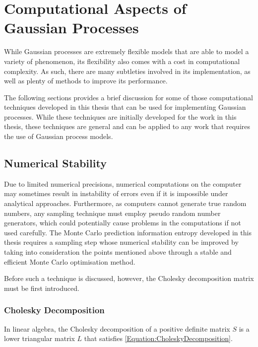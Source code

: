 \chapter{Computational Aspects of Gaussian Processes}
\label{Appendix:ComputationalAspects}

	While Gaussian processes are extremely flexible models that are able to model a variety of phenomenon, its flexibility also comes with a cost in computational complexity. As such, there are many subtleties involved in its implementation, as well as plenty of methods to improve its performance.
	
	The following sections provides a brief discussion for some of those computational techniques developed in this thesis that can be used for implementing Gaussian processes. While these techniques are initially developed for the work in this thesis, these techniques are general and can be applied to any work that requires the use of Gaussian process models. 
	
	\section{Numerical Stability}
	\label{Appendix:ComputationalAspects:NumericalStability}
	
		Due to limited numerical precisions, numerical computations on the computer may sometimes result in instability of errors even if it is impossible under analytical approaches. Furthermore, as computers cannot generate true random numbers, any sampling technique must employ pseudo random number generators, which could potentially cause problems in the computations if not used carefully. The Monte Carlo prediction information entropy  developed in this thesis requires a sampling step whose numerical stability can be improved by taking into consideration the points mentioned above through a stable and efficient Monte Carlo optimisation method.
		
		Before such a technique is discussed, however, the Cholesky decomposition matrix must be first introduced.
		
		\subsection{Cholesky Decomposition}
		\label{Appendix:ComputationalAspects:NumericalStability:Cholesky}
			
			In linear algebra, the Cholesky decomposition of a positive definite matrix $S$ is a lower triangular matrix $L$ that satisfies \eqref{Equation:CholeskyDecomposition}.
			
